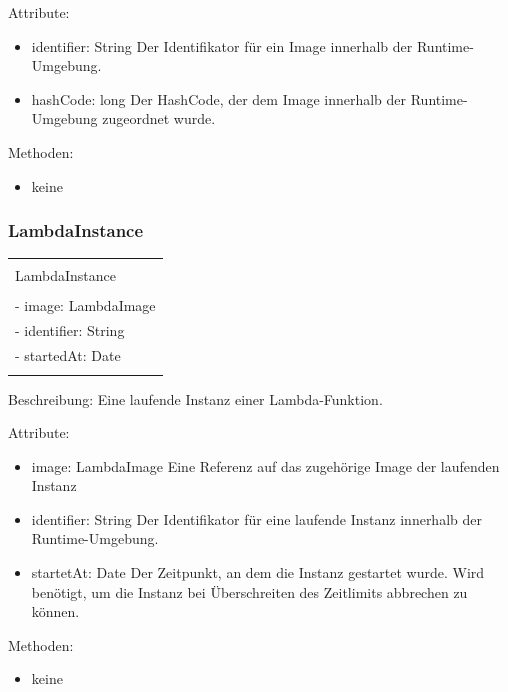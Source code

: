 \documentclass[a4paper,20pt,oneside]{book}
\begin{document}
	Attribute:
	\begin{itemize}
	\item identifier: String
	\linebreak Der Identifikator für ein Image innerhalb der Runtime-Umgebung.
	\item hashCode: long
	\linebreak Der HashCode, der dem Image innerhalb der Runtime-Umgebung zugeordnet wurde.
	\end{itemize}
	
	Methoden:
	\begin{itemize}
	\item keine
	\end{itemize}	
		
	\subsubsection{LambdaInstance}
	\centering
	\begin{tabular}{|l|}
	\hline \\
	LambdaInstance \\
	\hline \\
	- image: LambdaImage \\
	- identifier: String \\
	- startedAt: Date \\
	\hline \\
	\hline 
	\end{tabular}
	
	\raggedright
	\vspace{0.5cm}	
	
	Beschreibung: Eine laufende Instanz einer Lambda-Funktion.
	\vspace{0.5cm}
	
	Attribute:
	\begin{itemize}
	\item image: LambdaImage
	\linebreak Eine Referenz auf das zugehörige Image der laufenden Instanz
	\item identifier: String
	\linebreak Der Identifikator für eine laufende Instanz innerhalb der Runtime-Umgebung.
	\item startetAt: Date
	\linebreak Der Zeitpunkt, an dem die Instanz gestartet wurde. Wird benötigt, um die Instanz bei Überschreiten des Zeitlimits abbrechen zu können.
	\end{itemize}
	
	Methoden:
	\begin{itemize}
	\item keine
	\end{itemize}
		
\end{document}

